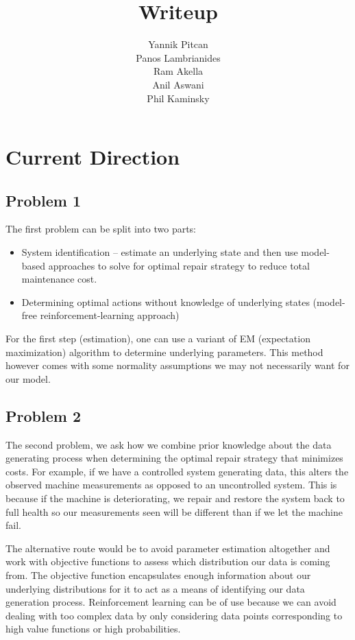 \documentclass[english]{article}
\numberwithin{equation}{section}
\begin{document}
	
	\title{Writeup}
	
	\author{Yannik Pitcan \\
		Panos Lambrianides \\
		Ram Akella \\
		Anil Aswani \\
		Phil Kaminsky
	}
	\maketitle

\section*{Current Direction}

\subsection*{Problem 1}
The first problem can be split into two parts:

\begin{itemize}
	\item System identification -- estimate an underlying state and then use model-based approaches to solve for optimal repair strategy to reduce total maintenance cost.
	\item Determining optimal actions without knowledge of underlying states (model-free reinforcement-learning approach)
\end{itemize}

For the first step (estimation), one can use a variant of EM (expectation maximization) algorithm to determine underlying parameters. This method however comes with some normality assumptions we may not necessarily want for our model.

\subsection*{Problem 2}

The second problem, we ask how we combine prior knowledge about the data generating process when determining the optimal repair strategy that minimizes costs. For example, if we have a controlled system generating data, this alters the observed machine measurements as opposed to an uncontrolled system. This is because if the machine is deteriorating, we repair and restore the system back to full health so our measurements seen will be different than if we let the machine fail.

The alternative route would be to avoid parameter estimation altogether and work with objective functions to assess which distribution our data is coming from. The objective function encapsulates enough information about our underlying distributions for it to act as a means of identifying our data generation process. Reinforcement learning can be of use because we can avoid dealing with too complex data by only considering data points corresponding to high value functions or high probabilities.
\end{document}
